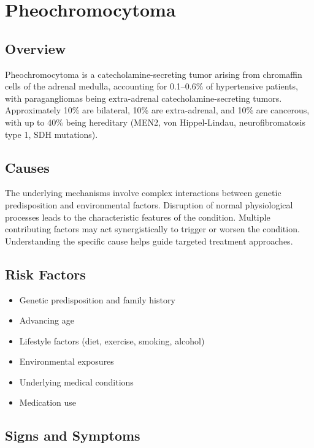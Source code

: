 \chapter{Pheochromocytoma}
\label{sec:Pheochromocytoma}

\section{Overview}
Pheochromocytoma is a catecholamine-secreting tumor arising from chromaffin cells of the adrenal medulla, accounting for 0.1--0.6\% of hypertensive patients, with paragangliomas being extra-adrenal catecholamine-secreting tumors. Approximately 10\% are bilateral, 10\% are extra-adrenal, and 10\% are cancerous, with up to 40\% being hereditary (MEN2, von Hippel-Lindau, neurofibromatosis type 1, SDH mutations).
\section{Causes}
The underlying mechanisms involve complex interactions between genetic predisposition and environmental factors. Disruption of normal physiological processes leads to the characteristic features of the condition. Multiple contributing factors may act synergistically to trigger or worsen the condition. Understanding the specific cause helps guide targeted treatment approaches.
\section{Risk Factors}


\begin{itemize}[noitemsep]
  \item Genetic predisposition and family history
  \item Advancing age
  \item Lifestyle factors (diet, exercise, smoking, alcohol)
  \item Environmental exposures
  \item Underlying medical conditions
  \item Medication use
\end{itemize}
\section{Signs and Symptoms}

